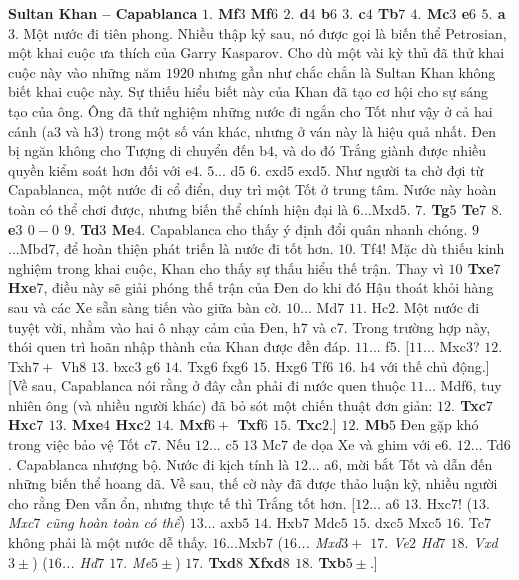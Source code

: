 \begin{multicols}{2}
	\vskip 0.1cm
	\textbf{\color{gocco}Sultan Khan -- Capablanca}
	\vskip 0.1cm
	\textbf{\color{gocco}$1.$ Mf$3$ Mf$6$ $2.$ d$4$ b$6$ $3.$ c$4$ Tb$7$ $4.$ Mc$3$ e$6$ $5.$ a$3$}. Một nước đi tiên phong. Nhiều thập kỷ sau, nó được gọi là biến thể Petrosian, một khai cuộc ưa thích của Garry Kasparov. Cho dù một vài kỳ thủ đã thử khai cuộc  này vào những năm $1920$ nhưng gần như chắc chắn là Sultan Khan không biết khai cuộc này. Sự thiếu hiểu biết này của Khan đã tạo cơ hội cho sự sáng tạo của ông. Ông đã thử nghiệm những nước đi ngắn cho Tốt như vậy ở cả hai cánh (a$3$ và h$3$) trong một số ván khác, nhưng ở ván này là hiệu quả nhất. Đen bị ngăn không cho Tượng di chuyển đến b$4$, và do đó Trắng giành được nhiều quyền kiểm soát hơn đối với e$4$. $5$... d$5$ $6.$ cxd$5$ exd$5$. Như người ta chờ đợi từ Capablanca, một nước đi cổ điển, duy trì một Tốt ở trung tâm. Nước này hoàn toàn có thể chơi được, nhưng biến thể chính hiện đại là $6$...Mxd$5$. \textbf{\color{gocco}$7.$ Tg$5$ Te$7$ $8.$ e$3$ $0-0$ $9.$ Td$3$ Me$4$}. Capablanca cho thấy ý định đổi quân nhanh chóng. $9$...Mbd$7$, để hoàn thiện phát triến là nước đi tốt hơn. $10.$ Tf$4$! Mặc dù thiếu kinh nghiệm trong khai cuộc, Khan cho thấy sự thấu hiểu thế trận. Thay vì \textbf{\color{gocco}$10$ Txe$7$ Hxe$7$}, điều này sẽ giải phóng thế trận của Đen do khi đó Hậu thoát khỏi hàng sau và các Xe sẵn sàng tiến vào giữa bàn cờ. $10$... Md$7$ $11.$ Hc$2$. Một nước đi tuyệt vời, nhằm vào hai ô nhạy cảm của Đen, h$7$ và c$7$. Trong trường hợp này, thói quen trì hoãn nhập thành của Khan được đền đáp. $11$... f$5$.
	\vskip 0.1cm
	[$11$... Mxc$3$? $12.$ Txh$7+$ Vh$8$ $13.$ bxc$3$ g$6$ $14.$ Txg$6$ fxg6 $15.$ Hxg$6$ Tf$6$ $16.$ h$4$ với thế chủ động.]
	\vskip 0.1cm
	[Về sau, Capablanca nói rằng ở đây cần phải đi nước quen thuộc $11$... Mdf$6$, tuy nhiên ông (và nhiều người khác) đã bỏ sót một chiến thuật đơn giản: \textbf{\color{gocco}$12.$ Txc$7$ Hxc$7$ $13.$ Mxe$4$ Hxc$2$ $14.$ Mxf$6+$ Txf$6$ $15.$ Txc$2$}.]
	\vskip 0.1cm
	\textbf{\color{gocco}$12.$ Mb$5$} Đen gặp khó trong việc bảo vệ Tốt c$7$. Nếu $12$... c$5$ $13$ Mc$7$ đe dọa Xe và ghim với e$6$. $12$... Td$6$. Capablanca nhượng bộ. Nước đi kịch tính là $12$... a$6$, mời bắt Tốt và dẫn đến những biến thể hoang dã. Về sau, thế cờ này đã được thảo luận kỹ, nhiều người cho rằng Đen vẫn ổn, nhưng thực tế thì Trắng tốt hơn. 
	\vskip 0.1cm
	[$12$... a$6$ $13$. Hxc$7$! (\textit{$13.$ Mxc$7$ cũng hoàn toàn có thể}) $13$... axb$5$ $14.$ Hxb$7$ Mdc$5$ $15.$ dxc$5$ Mxc$5$ $16.$ Tc$7$ không phải là một nước dễ thấy. $16$...Mxb$7$ (\textit{$16$... Mxd$3+$ $17.$ Ve$2$ Hd$7$ $18.$ Vxd$3\pm$}) (\textit{$16$... Hd$7$ $17.$ Me$5\pm$}) \textbf{\color{gocco}$17.$ Txd$8$ Xfxd$8$ $18.$ Txb$5\pm$}.]

\end{multicols}
